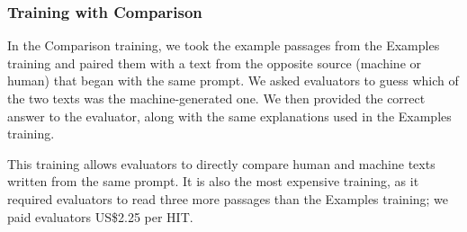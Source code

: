 \subsubsection{Training with Comparison}
In the Comparison training, we took the example passages from the Examples training and paired them with a text from the opposite source (machine or human) that began with the same prompt. 
We asked evaluators to guess which of the two texts was the machine-generated one.
We then provided the correct answer to the evaluator, along with the same explanations used in the Examples training.

This training allows evaluators to directly compare human and machine texts written from the same prompt.
It is also the most expensive training, as it required evaluators to read three more passages than the Examples training; we paid evaluators US\$2.25 per HIT.

